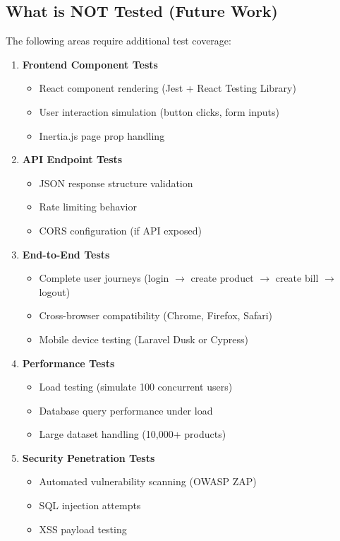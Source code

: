 \subsection{What is NOT Tested (Future Work)}

The following areas require additional test coverage:

\begin{enumerate}[leftmargin=*]
    \item \textbf{Frontend Component Tests}
    \begin{itemize}
        \item React component rendering (Jest + React Testing Library)
        \item User interaction simulation (button clicks, form inputs)
        \item Inertia.js page prop handling
    \end{itemize}
    
    \item \textbf{API Endpoint Tests}
    \begin{itemize}
        \item JSON response structure validation
        \item Rate limiting behavior
        \item CORS configuration (if API exposed)
    \end{itemize}
    
    \item \textbf{End-to-End Tests}
    \begin{itemize}
        \item Complete user journeys (login $\rightarrow$ create product $\rightarrow$ create bill $\rightarrow$ logout)
        \item Cross-browser compatibility (Chrome, Firefox, Safari)
        \item Mobile device testing (Laravel Dusk or Cypress)
    \end{itemize}
    
    \item \textbf{Performance Tests}
    \begin{itemize}
        \item Load testing (simulate 100 concurrent users)
        \item Database query performance under load
        \item Large dataset handling (10,000+ products)
    \end{itemize}
    
    \item \textbf{Security Penetration Tests}
    \begin{itemize}
        \item Automated vulnerability scanning (OWASP ZAP)
        \item SQL injection attempts
        \item XSS payload testing
    \end{itemize}
\end{enumerate}

